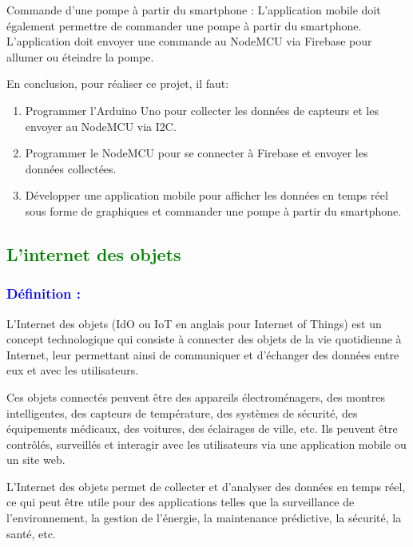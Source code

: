 \begin{flushleft}
	Commande d'une pompe à partir du smartphone :
	L'application mobile doit également permettre de commander une pompe à partir du smartphone. L'application doit envoyer une commande au NodeMCU via Firebase pour allumer ou éteindre la pompe.\newline
	
	En conclusion, pour réaliser ce projet, il faut:\newline
	
	\begin{enumerate}
		\item Programmer l'Arduino Uno pour collecter les données de capteurs et les envoyer au NodeMCU via I2C.
		\item 	Programmer le NodeMCU pour se connecter à Firebase et envoyer les données collectées.
		\item 	Développer une application mobile pour afficher les données en temps réel sous forme de graphiques et commander une pompe à partir du smartphone.
	\end{enumerate}
	\subsection{\textcolor{green}{L'internet des objets}}
	
	\subsubsection{\textcolor{blue}{Définition :}}
	L'Internet des objets (IdO ou IoT en anglais pour Internet of Things) est un concept technologique qui consiste à connecter des objets de la vie quotidienne à Internet, leur permettant ainsi de communiquer et d'échanger des données entre eux et avec les utilisateurs.\newline
	
	Ces objets connectés peuvent être des appareils électroménagers, des montres intelligentes, des capteurs de température, des systèmes de sécurité, des équipements médicaux, des voitures, des éclairages de ville, etc. Ils peuvent être contrôlés, surveillés et interagir avec les utilisateurs via une application mobile ou un site web.\newline
	
	L'Internet des objets permet de collecter et d'analyser des données en temps réel, ce qui peut être utile pour des applications telles que la surveillance de l'environnement, la gestion de l'énergie, la maintenance prédictive, la sécurité, la santé, etc.\newline
	

\end{flushleft}
